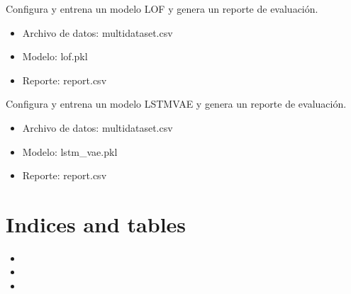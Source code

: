 \documentclass[letterpaper,10pt,english]{sphinxmanual}
\begin{document}

\begin{fulllineitems}
\label{\detokenize{tutorial:tutorial.lofTutorial}}
\pysigstartsignatures
{}
\pysigstopsignatures
\sphinxAtStartPar
Configura y entrena un modelo LOF y genera un reporte de evaluación.
\begin{itemize}
\item {} 
\sphinxAtStartPar
Archivo de datos: multi\sphinxhyphen{}dataset.csv

\item {} 
\sphinxAtStartPar
Modelo: lof.pkl

\item {} 
\sphinxAtStartPar
Reporte: report.csv

\end{itemize}

\end{fulllineitems}


\begin{fulllineitems}
\label{\detokenize{tutorial:tutorial.lstmVaeTutorial}}
\pysigstartsignatures
{}
\pysigstopsignatures
\sphinxAtStartPar
Configura y entrena un modelo LSTM\sphinxhyphen{}VAE y genera un reporte de evaluación.
\begin{itemize}
\item {} 
\sphinxAtStartPar
Archivo de datos: multi\sphinxhyphen{}dataset.csv

\item {} 
\sphinxAtStartPar
Modelo: lstm\_vae.pkl

\item {} 
\sphinxAtStartPar
Reporte: report.csv

\end{itemize}

\end{fulllineitems}



\chapter{Indices and tables}
\label{\detokenize{index:indices-and-tables}}\begin{itemize}
\item {} 
\sphinxAtStartPar
{}

\item {} 
\sphinxAtStartPar
{}

\item {} 
\sphinxAtStartPar
{}

\end{itemize}
\end{document}
